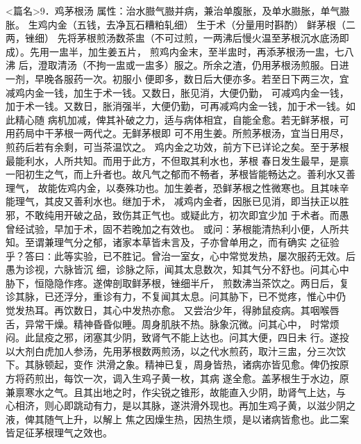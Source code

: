 \documentclass[a4paper,12pt,UTF8,twoside]{ctexbook}
\begin{document}
<篇名>9．鸡茅根汤
属性：治水臌气臌并病，兼治单腹胀，及单水臌胀，单气臌胀。 
生鸡内金（五钱，去净瓦石糟粕轧细） 生于术（分量用时斟酌） 鲜茅根（二两，锉细） 
先将茅根煎汤数茶盅（不可过煎，一两沸后慢火温至茅根沉水底汤即成）。先用一盅半，加生姜五片， 
煎鸡内金末，至半盅时，再添茅根汤一盅，七八沸 
后，澄取清汤（不拘一盅或一盅多）服之。所余之渣，仍用茅根汤煎服。日进一剂，早晚各服药一次。初服小 
便即多，数日后大便亦多。若至日下两三次，宜减鸡内金一钱，加生于术一钱。又数日，胀见消，大便仍勤， 
可减鸡内金一钱，加于术一钱。又数日，胀消强半，大便仍勤，可再减鸡内金一钱，加于术一钱。如此精心随 
病机加减，俾其补破之力，适与病体相宜，自能全愈。若无鲜茅根，可用药局中干茅根一两代之。无鲜茅根即 
可不用生姜。所煎茅根汤，宜当日用尽，煎药后若有余剩，可当茶温饮之。 
鸡内金之功效，前方下已详论之矣。至于茅根最能利水，人所共知。而用于此方，不但取其利水也，茅根 
春日发生最早，是禀一阳初生之气，而上升者也。故凡气之郁而不畅者，茅根皆能畅达之。善利水又善理气， 
故能佐鸡内金，以奏殊功也。加生姜者，恐鲜茅根之性微寒也。且其味辛能理气，其皮又善利水也。继加于术， 
减鸡内金者，因胀已见消，即当扶正以胜邪，不敢纯用开破之品，致伤其正气也。或疑此方，初次即宜少加 
于术者。而愚曾经试验，早加于术，固不若晚加之有效也。 
或问∶茅根能清热利小便，人所共知。至谓兼理气分之郁，诸家本草皆未言及，子亦曾单用之，而有确实 
之征验乎？答曰∶此等实验，已不胜记。曾治一室女，心中常觉发热，屡次服药无效。后愚为诊视，六脉皆沉 
细，诊脉之际，闻其太息数次，知其气分不舒也。问其心中胁下，恒隐隐作疼。遂俾剖取鲜茅根，锉细半斤， 
煎数沸当茶饮之。两日后，复诊其脉，已还浮分，重诊有力，不复闻其太息。问其胁下，已不觉疼，惟心中仍 
觉发热耳。再饮数日，其心中发热亦愈。 
又尝治少年，得肺鼠疫病。其咽喉唇舌，异常干燥。精神昏昏似睡。周身肌肤不热。脉象沉微。问其心中， 
时常烦闷。此鼠疫之邪，闭塞其少阴，致肾气不能上达也。问其大便，四日未 
行。遂投以大剂白虎加人参汤，先用茅根数两煎汤，以之代水煎药，取汁三盅，分三次饮下。其脉顿起，变作 
洪滑之象。精神已复，周身皆热，诸病亦皆见愈。俾仍按原方将药煎出，每饮一次，调入生鸡子黄一枚，其病 
遂全愈。盖茅根生于水边，原兼禀寒水之气。且其出地之时，作尖锐之锥形，故能直入少阴，助肾气上达，与 
心相济，则心即跳动有力，是以其脉，遂洪滑外现也。再加生鸡子黄，以滋少阴之液，俾其随气上升，以解上 
焦之因燥生热，因热生烦，是以诸病皆愈也。此二案皆足征茅根理气之效也。 
\end{document}
